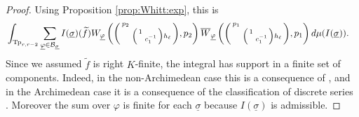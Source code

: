 \documentclass[12pt]{amsart}
\theoremstyle{remark}
\numberwithin{equation}{section}
\theoremstyle{definition}
\newenvironment{psmatrix}
  {\left(\begin{smallmatrix}}
  {\end{smallmatrix}\right)}
\numberwithin{equation}{subsection}
\begin{document}
\begin{proof}
Using  Proposition \ref{prop:Whitt:exp}, this is 
\begin{align*}
&\int_{\mathrm{Tp}_{r,r-2}}\sum_{\underline{\varphi} \in \mathcal{B}_{\underline{\sigma}}}I(\underline{\sigma})(\widetilde{f})W_{\underline{\varphi}}\left(\begin{psmatrix} p_2 & \\ & \begin{psmatrix} 1 & \\ & c_1^{-1}\end{psmatrix}h_\ell\end{psmatrix},p_2\right)
\overline{W}_{\underline{\varphi}}\left(\begin{psmatrix} p_1 & \\ & \begin{psmatrix} 1 & \\ & c_1^{-1}\end{psmatrix}h_\ell\end{psmatrix},p_1\right)d\mu(I(\underline{\sigma})).
\end{align*}
   Since we assumed $\widetilde{f}$ is right $K$-finite, the integral has support in a finite set of components. Indeed, in the non-Archimedean case this is a consequence of \cite[Theorem VIII.1.2]{Waldspurger:plancherel}, and in the Archimedean case it is a consequence of the classification of discrete series \cite[Theorem 9.20, Chapter XII]{KnappSS}.  Moreover
 the sum over $\varphi$ is finite for each $\underline{\sigma}$ because $I(\underline{\sigma})$ is admissible.
 

\end{proof}
\end{document}
